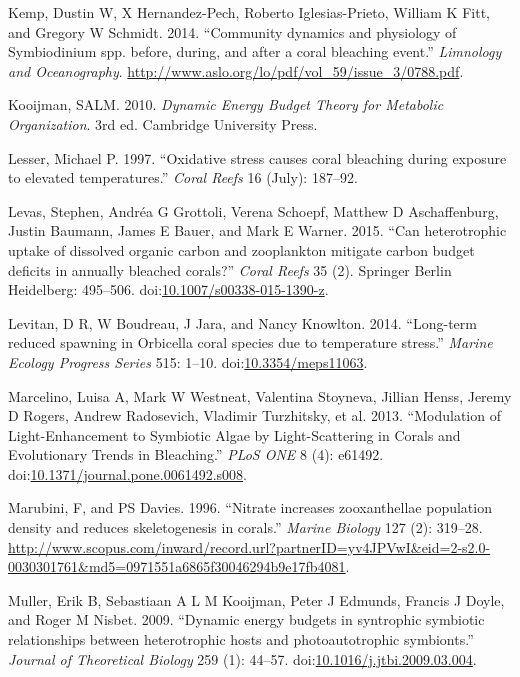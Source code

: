 \documentclass[]{elsarticle} %
\begin{document}
\hypertarget{ref-Kemp:2014ug}{}
Kemp, Dustin W, X Hernandez-Pech, Roberto Iglesias-Prieto, William K
Fitt, and Gregory W Schmidt. 2014. ``Community dynamics and physiology
of Symbiodinium spp. before, during, and after a coral bleaching
event.'' \emph{Limnology and Oceanography}.
\url{http://www.aslo.org/lo/pdf/vol_59/issue_3/0788.pdf}.

\hypertarget{ref-Kooijman:2010vd}{}
Kooijman, SALM. 2010. \emph{Dynamic Energy Budget Theory for Metabolic
Organization}. 3rd ed. Cambridge University Press.

\hypertarget{ref-Lesser:1997p3587}{}
Lesser, Michael P. 1997. ``Oxidative stress causes coral bleaching
during exposure to elevated temperatures.'' \emph{Coral Reefs} 16
(July): 187--92.

\hypertarget{ref-Levas:2015ic}{}
Levas, Stephen, Andréa G Grottoli, Verena Schoepf, Matthew D
Aschaffenburg, Justin Baumann, James E Bauer, and Mark E Warner. 2015.
``Can heterotrophic uptake of dissolved organic carbon and zooplankton
mitigate carbon budget deficits in annually bleached corals?''
\emph{Coral Reefs} 35 (2). Springer Berlin Heidelberg: 495--506.
doi:\href{https://doi.org/10.1007/s00338-015-1390-z}{10.1007/s00338-015-1390-z}.

\hypertarget{ref-Levitan:2014et}{}
Levitan, D R, W Boudreau, J Jara, and Nancy Knowlton. 2014. ``Long-term
reduced spawning in Orbicella coral species due to temperature stress.''
\emph{Marine Ecology Progress Series} 515: 1--10.
doi:\href{https://doi.org/10.3354/meps11063}{10.3354/meps11063}.

\hypertarget{ref-Marcelino:2013hz}{}
Marcelino, Luisa A, Mark W Westneat, Valentina Stoyneva, Jillian Henss,
Jeremy D Rogers, Andrew Radosevich, Vladimir Turzhitsky, et al. 2013.
``Modulation of Light-Enhancement to Symbiotic Algae by Light-Scattering
in Corals and Evolutionary Trends in Bleaching.'' \emph{PLoS ONE} 8 (4):
e61492.
doi:\href{https://doi.org/10.1371/journal.pone.0061492.s008}{10.1371/journal.pone.0061492.s008}.

\hypertarget{ref-Marubini:1996p8460}{}
Marubini, F, and PS Davies. 1996. ``Nitrate increases zooxanthellae
population density and reduces skeletogenesis in corals.'' \emph{Marine
Biology} 127 (2): 319--28.
\url{http://www.scopus.com/inward/record.url?partnerID=yv4JPVwI\&eid=2-s2.0-0030301761\&md5=0971551a6865f30046294b9e17fb4081}.

\hypertarget{ref-Muller:2009io}{}
Muller, Erik B, Sebastiaan A L M Kooijman, Peter J Edmunds, Francis J
Doyle, and Roger M Nisbet. 2009. ``Dynamic energy budgets in syntrophic
symbiotic relationships between heterotrophic hosts and photoautotrophic
symbionts.'' \emph{Journal of Theoretical Biology} 259 (1): 44--57.
doi:\href{https://doi.org/10.1016/j.jtbi.2009.03.004}{10.1016/j.jtbi.2009.03.004}.
\end{document}
